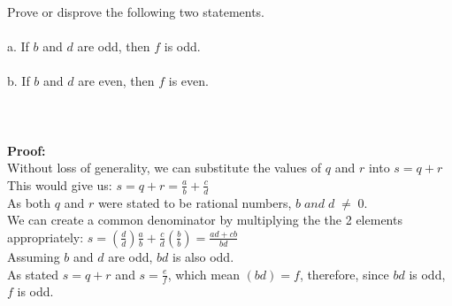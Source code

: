\documentclass{amsart}
\theoremstyle{definition}
\theoremstyle{Exercise}
\theoremstyle{remark}
\theoremstyle{rule}
\numberwithin{equation}{section}
\begin{document}
 Prove or disprove the following two statements.
\\\\
a.  If $b$ and $d$ are odd, then $f$ is odd.
\\\\
b. If $b$ and $d$ are even, then $f$ is even.
\\\\
\\\\
\textbf{Proof:}\\
Without loss of generality, we can substitute the values of $q$ and $r$ into $s = q + r$\\
This would give us: $s = q + r = \frac{a}{b} + \frac{c}{d}$\\
As both $q$ and $r$ were stated to be rational numbers, $b\; and\; d\; \neq\; 0$.\\
We can create a common denominator by multiplying the the 2 elements appropriately: $s = (\frac{d}{d})\frac{a}{b} + \frac{c}{d}(\frac{b}{b}) = \frac{ad + cb}{bd}$\\
Assuming $b$ and $d$ are odd, $bd$ is also odd.\\
As stated $s = q + r$ and $s = \frac{e}{f}$, which mean $(bd) = f$, therefore, since $bd$ is odd, $f$ is odd. \qedsymbol
\\\\


\newpage
\vspace*{0.5in}
\end{document}
